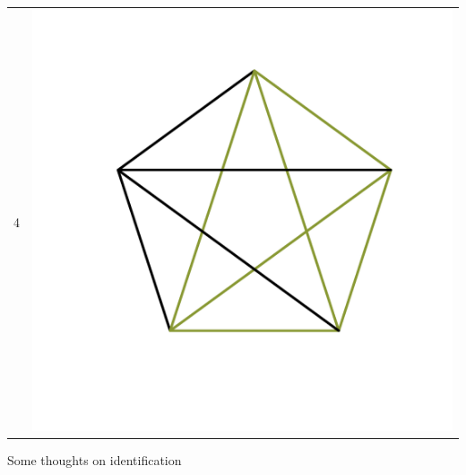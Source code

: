\documentclass[20pt]{beamer}
\begin{document}
\begin{frame}[plain]
\begin{center}
\begin{tabular}{S D}
4 & \includegraphics[scale=.3]{Figures/4dgraph.pdf} \\
\end{tabular}
\end{center}
\end{frame}


\begin{frame}[plain]
\Large
\begin{center}
Some thoughts on identification
\end{center}
\end{frame}


\begin{frame}[plain]
\begin{center}
\end{center}
\end{frame}
\end{document}
